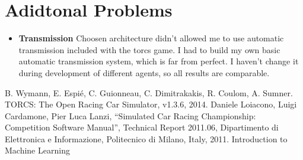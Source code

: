\documentclass[declaration,shortabstract,english,inz]{iithesis}
\begin{document}
\chapter{Adidtonal Problems}

\begin{itemize}
    \item \textbf{Transmission} Choosen architecture didn't allowed me to use automatic transmission included with the torcs game. I had to build my own basic automatic transmission system, which is far from perfect. I haven't change it during development of different agents, so all results are comparable. 
\end{itemize}



\begin{thebibliography}{1}
 B. Wymann, E. Espié, C. Guionneau, C. Dimitrakakis, R. Coulom, A. Sumner. TORCS: The Open Racing Car Simulator, v1.3.6, 2014.
 Daniele Loiacono, Luigi Cardamone, Pier Luca Lanzi, “Simulated Car
Racing Championship: Competition Software Manual”, Technical Report 2011.06, Dipartimento
di Elettronica e Informazione, Politecnico di Milano, Italy, 2011.
 Introduction to Machine Learning

\end{thebibliography}
\end{document}

